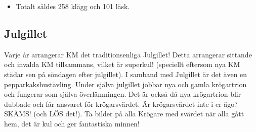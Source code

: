 \documentclass[10pt]{article}
\begin{document}
\begin{itemize}
\begin{dashlist}
    \end{dashlist}
    \item Totalt såldes 258 klägg och 101 läsk.

\end{itemize}

\subsection{Julgillet}
Varje år arrangerar KM det traditionsenliga Julgillet! Detta arrangerar sittande och
invalda KM tillsammans, vilket är superkul! (speciellt eftersom nya KM städar sen på
söndagen efter julgillet). I samband med Julgillet är det även en pepparkakshustävling. Under själva julgillet jobbar nya och gamla krögartrion och fungerar som själva överlämningen. Det är också då nya krögartrion blir dubbade och får ansvaret för
krögarsvärdet. Är krögarsvärdet inte i er ägo? SKÄMS! (och LÖS det!). Ta bilder på alla
Krögare med svärdet när alla gått hem, det är kul och ger fantastiska minnen!
\end{document}
